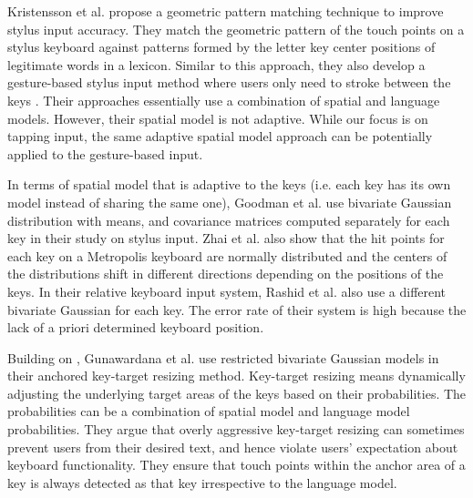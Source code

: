 \documentclass{sigchi}
\begin{document}
Kristensson et al. \cite{Kristensson:2005} propose a geometric pattern matching technique to improve 
stylus input accuracy. They match the geometric pattern of the touch points on a stylus keyboard against patterns formed by 
the letter key center positions of legitimate words in a lexicon. Similar to this approach,
they also develop a gesture-based stylus input method where users only need to stroke between the keys \cite{Kristensson:2004}.
Their approaches essentially use a combination of spatial and language models. However, 
their spatial model is not adaptive. While our focus is on tapping input, the same adaptive spatial model approach
can be potentially applied to the gesture-based input.

In terms of spatial model that is adaptive to the keys (i.e. each key has its own model instead of
sharing the same one), Goodman et al. \cite{Goodman:2002} use bivariate Gaussian distribution with means, and
covariance matrices computed separately for each key in their study on stylus input. Zhai et al. \cite{Zhai:2002} also show that
the hit points for each key on a Metropolis keyboard \cite{Zhai:2000} are normally distributed and 
the centers of the distributions shift in different directions depending on the positions of
the keys. In their relative keyboard input system, Rashid et al. \cite{Rashid:2008} also use a different bivariate
Gaussian for each key. The error rate of their system is high because the lack of 
a priori determined keyboard position.

Building on \cite{Goodman:2002}, Gunawardana et al. \cite{Gunawardana:2010} use restricted bivariate Gaussian
models in their anchored key-target resizing method. Key-target resizing means dynamically
adjusting the underlying target areas of the keys based on their probabilities. The probabilities can 
be a combination of spatial model and language model probabilities.
They argue that overly aggressive
key-target resizing can sometimes prevent users from their desired text, and hence violate
users' expectation about keyboard functionality. They ensure that touch points within
the anchor area of a key is always detected as that key irrespective to the language model.
\end{document}
